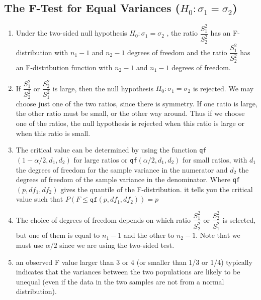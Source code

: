 \subsection{The F-Test for Equal Variances ($H_0 : \sigma_1 = \sigma_2 $)}


\begin{enumerate}
    \item Under the two-sided null hypothesis $H_0 : \sigma_1 = \sigma_2$ , the ratio $\dfrac{S^2_1}{S^2_2}$ has an F-distribution with $n_1 - 1$ and $n_2 - 1$ degrees of freedom and the ratio $\dfrac{S^2_1}{S^2_2}$ has an F-distribution function with $n_2 - 1$ and $n_1 - 1$ degrees of freedom.
    \hfill \cite{statistics/book/Statistics-for-Data-Scientists/Maurits-Kaptein}

    \item  If $\dfrac{S^2_1}{S^2_2}$ or $\dfrac{S^2_ 2}{S^2_ 1}$ is large, then the null hypothesis $H_0 : \sigma_1 = \sigma_2$ is rejected.
    We may choose just one of the two ratios, since there is symmetry. If one ratio is large, the other ratio must be small, or the other way around.
    Thus if we choose one of the ratios, the null hypothesis is rejected when this ratio is large or when this ratio is small.
    \hfill \cite{statistics/book/Statistics-for-Data-Scientists/Maurits-Kaptein}

    \item The critical value can be determined by using the function \verb|qf|$(1 - \alpha/2,d_1 ,d_2 )$ for large ratios or \verb|qf|$(\alpha/2,d_1 ,d_2 )$ for small ratios, with $d_1$ the degrees of freedom for the sample variance in the numerator and $d_2$ the degrees of freedom of the sample variance in the denominator.
    Where \verb|qf|$(p, df_1, df_2)$ gives the quantile of the F-distribution. it tells you the critical value such that $P(F\leq\texttt{qf}(p,df_1,df_2))=p$
    \hfill \cite{statistics/book/Statistics-for-Data-Scientists/Maurits-Kaptein}

    \item The choice of degrees of freedom depends on which ratio $\dfrac{S^2_1}{S^2_2}$ or $\dfrac{S^2_ 2}{S^2_ 1}$ is selected, but one of them is equal to $n_1 - 1$ and the other to $n_2 - 1$. 
    Note that we must use $\alpha/2$ since we are using the two-sided test. 
    \hfill \cite{statistics/book/Statistics-for-Data-Scientists/Maurits-Kaptein}

    \item  an observed F value larger than 3 or 4 (or smaller than 1/3 or 1/4) typically indicates that the variances between the two populations are likely to be unequal (even if the data in the two samples are not from a normal distribution). 
    \hfill \cite{statistics/book/Statistics-for-Data-Scientists/Maurits-Kaptein}
\end{enumerate}



